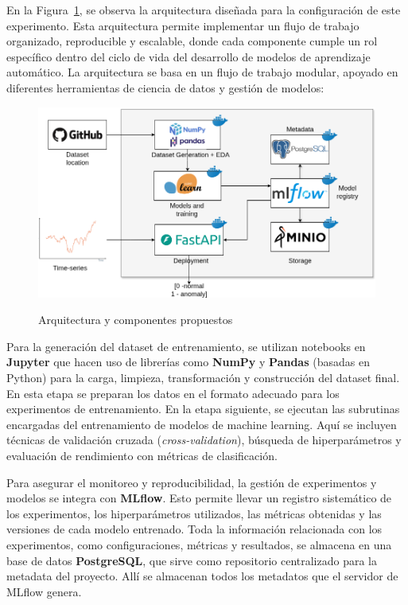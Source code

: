\documentclass[11pt,a4paper,spanish]{book}
\numberwithin{equation}{chapter}
\numberwithin{figure}{chapter}
\begin{document}
En la Figura~\ref{fig:figArchitecture}, se observa la arquitectura diseñada para la 
configuración de este experimento. Esta arquitectura permite implementar un flujo de 
trabajo organizado, reproducible y escalable, donde cada componente cumple un rol 
específico dentro del ciclo de vida del desarrollo de modelos de aprendizaje automático.
La arquitectura se basa en un flujo de trabajo modular, apoyado en diferentes 
herramientas de ciencia de datos y gestión de modelos:


\begin{figure}[H]
    \caption{Arquitectura y componentes propuestos}
    \centering
    \includegraphics[width=1\textwidth]{media/arquitecura.png}
    \label{fig:figArchitecture}
\end{figure}


Para la generación del dataset de entrenamiento, se utilizan notebooks en \textbf{Jupyter} 
que hacen uso de librerías como \textbf{NumPy} y \textbf{Pandas} (basadas en Python) para 
la carga, limpieza, transformación y construcción del dataset final. En esta etapa se 
preparan los datos en el formato adecuado para los experimentos de entrenamiento. 
En la etapa siguiente, se ejecutan las subrutinas encargadas del entrenamiento de 
modelos de machine learning. Aquí se incluyen técnicas de 
validación cruzada (\textit{cross-validation}), búsqueda de hiperparámetros 
y evaluación de rendimiento con métricas de clasificación.


Para asegurar el monitoreo y reproducibilidad, la gestión de experimentos y modelos se 
integra con \textbf{MLflow}. Esto permite llevar un registro 
sistemático de los experimentos, los hiperparámetros utilizados, las métricas obtenidas 
y las versiones de cada modelo entrenado. Toda la información relacionada con los 
experimentos, como configuraciones, métricas y resultados, se almacena en una base de 
datos \textbf{PostgreSQL}, que sirve como repositorio centralizado para la metadata del 
proyecto. Allí se almacenan todos los metadatos que el servidor de MLflow genera. 
\end{document}
